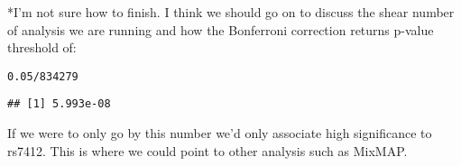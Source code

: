 \documentclass[11pt]{article}\usepackage[]{graphicx}\usepackage[]{color}
\makeatletter
\newcommand{\hlnum}[1]{\textcolor[rgb]{0.686,0.059,0.569}{#1}}%
\newcommand{\hlopt}[1]{\textcolor[rgb]{0,0,0}{#1}}%
\newenvironment{kframe}{%
 \def\at@end@of@kframe{}%
 \ifinner\ifhmode%
  \def\at@end@of@kframe{\end{minipage}}%
  \begin{minipage}{\columnwidth}%
 \fi\fi%
 \def\FrameCommand##1{\hskip\@totalleftmargin \hskip-\fboxsep
 \colorbox{shadecolor}{##1}\hskip-\fboxsep
     \hskip-\linewidth \hskip-\@totalleftmargin \hskip\columnwidth}%
 \MakeFramed {\advance\hsize-\width
   \@totalleftmargin\z@ \linewidth\hsize
   \@setminipage}}%
 {\par\unskip\endMakeFramed%
 \at@end@of@kframe}
\newenvironment{knitrout}{}{} %
\makeatother
\begin{document}
*I'm not sure how to finish.  I think we should go on to discuss the shear number of analysis we are running and how the Bonferroni correction returns p-value threshold of:
\begin{knitrout}
\color{fgcolor}\begin{kframe}
\begin{alltt}
\hlnum{0.05}\hlopt{/}\hlnum{834279}
\end{alltt}
\begin{verbatim}
## [1] 5.993e-08
\end{verbatim}
\end{kframe}
\end{knitrout}

If we were to only go by this number we'd only associate high significance to rs7412.  This is where we could point to other analysis such as MixMAP.
                                              
\end{document}
